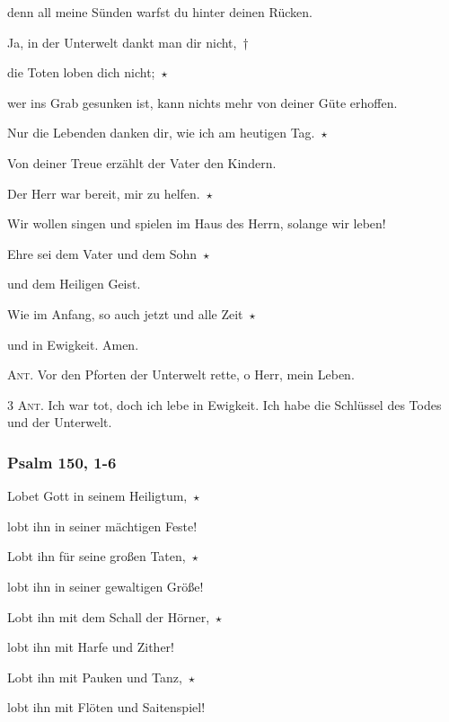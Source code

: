 denn all meine Sünden warfst du hinter deinen Rücken.

\noindent Ja, in der Unterwelt dankt man dir nicht,~†~\nopagebreak

die Toten loben dich nicht;~$\star$~\nopagebreak

wer ins Grab gesunken ist, kann nichts mehr von deiner Güte erhoffen.

\noindent Nur die Lebenden danken dir, wie ich am heutigen Tag.~$\star$~\nopagebreak

Von deiner Treue erzählt der Vater den Kindern.

\noindent Der Herr war bereit, mir zu helfen.~$\star$~\nopagebreak

Wir wollen singen und spielen im Haus des Herrn, solange wir leben!

\noindent Ehre sei dem Vater und dem Sohn~$\star$~\nopagebreak

und dem Heiligen Geist.

\noindent Wie im Anfang, so auch jetzt und alle Zeit~$\star$~\nopagebreak

und in Ewigkeit. Amen.

\vspace{10pt}

\noindent \textsc{Ant.} Vor den Pforten der Unterwelt rette, o Herr, mein Leben.

\vspace{10pt}

\noindent \textsc{3 Ant.} Ich war tot, doch ich lebe in Ewigkeit. Ich habe die Schlüssel des Todes und der Unterwelt.

\subsubsection{Psalm 150, 1-6}

\noindent Lobet Gott in seinem Heiligtum,~$\star$~\nopagebreak

lobt ihn in seiner mächtigen Feste!

\noindent Lobt ihn für seine großen Taten,~$\star$~\nopagebreak

lobt ihn in seiner gewaltigen Größe!

\noindent Lobt ihn mit dem Schall der Hörner,~$\star$~\nopagebreak

lobt ihn mit Harfe und Zither!

\noindent Lobt ihn mit Pauken und Tanz,~$\star$~\nopagebreak

lobt ihn mit Flöten und Saitenspiel!

